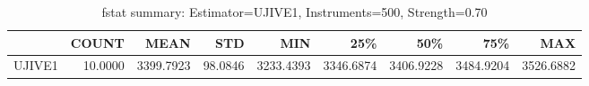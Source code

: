 \begin{table}[ht]
\centering
\caption{fstat summary: Estimator=UJIVE1, Instruments=500, Strength=0.70}
\begin{tabular}{lrrrrrrrr}
\toprule
 & COUNT & MEAN & STD & MIN & 25\% & 50\% & 75\% & MAX \\
\midrule
UJIVE1 & 10.0000 & 3399.7923 & 98.0846 & 3233.4393 & 3346.6874 & 3406.9228 & 3484.9204 & 3526.6882 \\
\bottomrule
\end{tabular}
\end{table}
